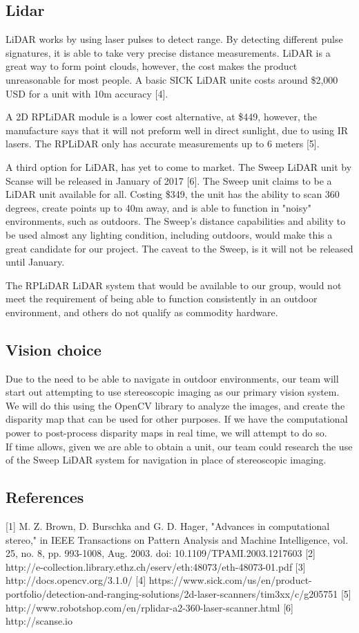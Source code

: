 \documentclass[compsoc,draftclsnofoot,onecolumn,10pt]{IEEEtran}
\begin{document}
\subsection{Lidar}
LiDAR works by using laser pulses to detect range. 
By detecting different pulse signatures, it is able to take very precise distance measurements. 
LiDAR is a great way to form point clouds, however, the cost makes the product unreasonable for most people. 
A basic SICK LiDAR unite costs around \$2,000 USD for a unit with 10m accuracy [4].\par
A 2D RPLiDAR module is a lower cost alternative, at \$449, however, the manufacture says that it will not preform well in direct sunlight, due to using IR lasers.   
The RPLiDAR only has accurate measurements up to 6 meters [5].\par
A third option for LiDAR, has yet to come to market. 
The Sweep LiDAR unit by Scanse will be released in January of 2017 [6]. 
The Sweep unit claims to be a LiDAR unit available for all.
Costing \$349, the unit has the ability to scan 360 degrees, create points up to 40m away, and is able to function in "noisy" environments, such as outdoors. 
The Sweep's distance capabilities and ability to be used almost any lighting condition, including outdoors, would make this a great candidate for our project.
The caveat to the Sweep, is it will not be released until January. \par
The RPLiDAR LiDAR system that would be available to our group, would not meet the requirement of being able to function consistently in an outdoor environment, and others do not qualify as commodity hardware. 

\subsection{Vision choice}
Due to the need to be able to navigate in outdoor environments, our team will start out attempting to use stereoscopic imaging as our primary vision system. We will do this using the OpenCV library to analyze the images, and create the disparity map that can be used for other purposes. If we have the computational power to post-process disparity maps in real time, we will attempt to do so. \\
If time allows, given we are able to obtain a unit, our team could research the use of the Sweep LiDAR system for navigation in place of stereoscopic imaging. 

\subsection{References}
[1] M. Z. Brown, D. Burschka and G. D. Hager, "Advances in computational stereo," in IEEE Transactions on Pattern Analysis and Machine Intelligence, vol. 25, no. 8, pp. 993-1008, Aug. 2003. doi: 10.1109/TPAMI.2003.1217603
[2] http://e-collection.library.ethz.ch/eserv/eth:48073/eth-48073-01.pdf
[3] http://docs.opencv.org/3.1.0/
[4] https://www.sick.com/us/en/product-portfolio/detection-and-ranging-solutions/2d-laser-scanners/tim3xx/c/g205751
[5] http://www.robotshop.com/en/rplidar-a2-360-laser-scanner.html
[6] http://scanse.io
\end{document}
